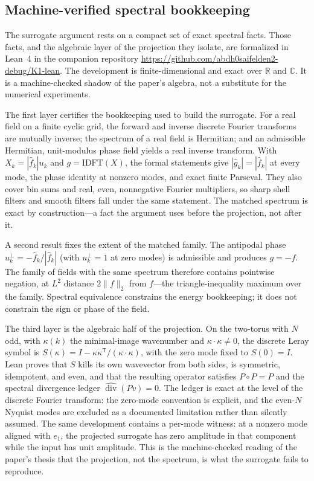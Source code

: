 \documentclass[11pt]{article}
\begin{document}
\subsection{Machine-verified spectral bookkeeping}
\label{sec:formal}

The surrogate argument rests on a compact set of exact spectral facts. Those facts, and the algebraic layer of the projection they isolate, are formalized in Lean~4 in the companion repository \url{https://github.com/abdh0saifelden2-debug/K1-lean}. The development is finite-dimensional and exact over $\mathbb{R}$ and $\mathbb{C}$. It is a machine-checked shadow of the paper's algebra, not a substitute for the numerical experiments.

The first layer certifies the bookkeeping used to build the surrogate. For a real field on a finite cyclic grid, the forward and inverse discrete Fourier transforms are mutually inverse; the spectrum of a real field is Hermitian; and an admissible Hermitian, unit-modulus phase field yields a real inverse transform. With $X_k=|\hat f_k|u_k$ and $g=\mathrm{IDFT}(X)$, the formal statements give $|\hat g_k|=|\hat f_k|$ at every mode, the phase identity at nonzero modes, and exact finite Parseval. They also cover bin sums and real, even, nonnegative Fourier multipliers, so sharp shell filters and smooth filters fall under the same statement. The matched spectrum is exact by construction---a fact the argument uses before the projection, not after it.

A second result fixes the extent of the matched family. The antipodal phase $u^\perp_k=-\hat f_k/|\hat f_k|$ (with $u^\perp_k=1$ at zero modes) is admissible and produces $g=-f$. The family of fields with the same spectrum therefore contains pointwise negation, at $L^2$ distance $2\|f\|_2$ from $f$---the triangle-inequality maximum over the family. Spectral equivalence constrains the energy bookkeeping; it does not constrain the sign or phase of the field.

The third layer is the algebraic half of the projection. On the two-torus with $N$ odd, with $\kappa(k)$ the minimal-image wavenumber and $\kappa\cdot\kappa\neq0$, the discrete Leray symbol is $S(\kappa)=I-\kappa\kappa^{\mathsf T}/(\kappa\cdot\kappa)$, with the zero mode fixed to $S(0)=I$. Lean proves that $S$ kills its own wavevector from both sides, is symmetric, idempotent, and even, and that the resulting operator satisfies $P\circ P=P$ and the spectral divergence ledger $\widehat{\operatorname{div}}(Pv)=0$. The ledger is exact at the level of the discrete Fourier transform: the zero-mode convention is explicit, and the even-$N$ Nyquist modes are excluded as a documented limitation rather than silently assumed. The same development contains a per-mode witness: at a nonzero mode aligned with $e_1$, the projected surrogate has zero amplitude in that component while the input has unit amplitude. This is the machine-checked reading of the paper's thesis that the projection, not the spectrum, is what the surrogate fails to reproduce.
\end{document}
